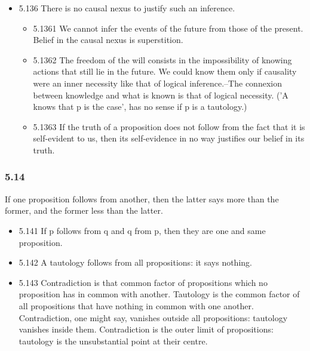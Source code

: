 \documentclass[11pt]{article}
\begin{document}
\begin{itemize}
\item 5.136
\label{sec:orge4053f0}
There is no causal nexus to justify such an inference.
\begin{itemize}
\item 5.1361
\label{sec:org5001de5}
We cannot infer the events of the future from those of the present.
Belief in the causal nexus is superstition.
\item 5.1362
\label{sec:orgc847c67}
The freedom of the will consists in the impossibility of knowing
actions that still lie in the future. We could know them only if causality
were an inner necessity like that of logical inference.--The connexion
between knowledge and what is known is that of logical necessity. ('A knows
that p is the case', has no sense if p is a tautology.)
\item 5.1363
\label{sec:org63ef55e}
If the truth of a proposition does not follow from the fact that it
is self-evident to us, then its self-evidence in no way justifies our
belief in its truth.
\end{itemize}
\end{itemize}
\subsubsection*{5.14}
\label{sec:org0cb73c9}
If one proposition follows from another, then the latter says more
than the former, and the former less than the latter.
\begin{itemize}
\item 5.141
\label{sec:orga807fba}
If p follows from q and q from p, then they are one and same
proposition.
\item 5.142
\label{sec:orgd750432}
A tautology follows from all propositions: it says nothing.
\item 5.143
\label{sec:orgfc926f4}
Contradiction is that common factor of propositions which no
proposition has in common with another. Tautology is the common factor of
all propositions that have nothing in common with one another.
Contradiction, one might say, vanishes outside all propositions: tautology
vanishes inside them. Contradiction is the outer limit of propositions:
tautology is the unsubstantial point at their centre.
\end{itemize}
\end{document}
